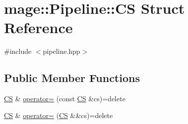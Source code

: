 \hypertarget{structmage_1_1_pipeline_1_1_c_s}{}\section{mage\+:\+:Pipeline\+:\+:CS Struct Reference}
\label{structmage_1_1_pipeline_1_1_c_s}


{\ttfamily \#include $<$pipeline.\+hpp$>$}

\subsection*{Public Member Functions}
\begin{DoxyCompactItemize}
\item 
\hyperlink{structmage_1_1_pipeline_1_1_c_s}{CS} \& \hyperlink{structmage_1_1_pipeline_1_1_c_s_a10548ffd40db2e3a11adf99297c04120}{operator=} (const \hyperlink{structmage_1_1_pipeline_1_1_c_s}{CS} \&cs)=delete
\item 
\hyperlink{structmage_1_1_pipeline_1_1_c_s}{CS} \& \hyperlink{structmage_1_1_pipeline_1_1_c_s_a5de3b7269c2bd70afd4f8caaa3b008c7}{operator=} (\hyperlink{structmage_1_1_pipeline_1_1_c_s}{CS} \&\&cs)=delete
\end{DoxyCompactItemize}
